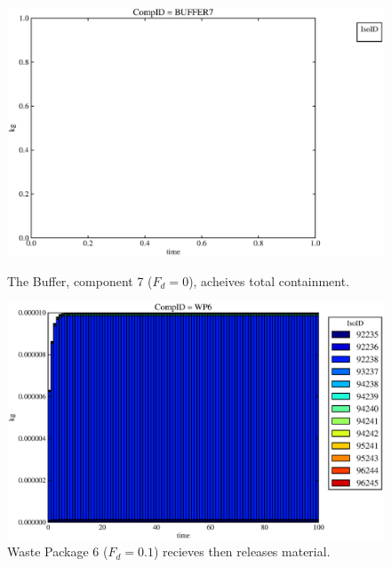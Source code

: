 \begin{figure}[ht]
\begin{minipage}[b]{0.45\linewidth}
  \includegraphics[width=\textwidth]{./chapters/demonstration/no_release/lpPFMII3.eps}
  \caption[Case LPPFMII Buffer Contaminants]{
    The Buffer, component 7 ($F_d=0$), acheives total containment.
    }
  \label{fig:lpPFMIIbuff}

\end{minipage}
\hspace{0.05\linewidth}
\begin{minipage}[b]{0.45\linewidth}
  \includegraphics[width=\textwidth]{./chapters/demonstration/no_release/lpPFMII2.eps}
  \caption[Case LPPFMII Waste Package Contaminants.]{ 
    Waste Package 6 ($F_d = 0.1$) recieves then releases material. 
    }
  \label{fig:lpPFMIIwp6}


\end{minipage}
\end{figure}
